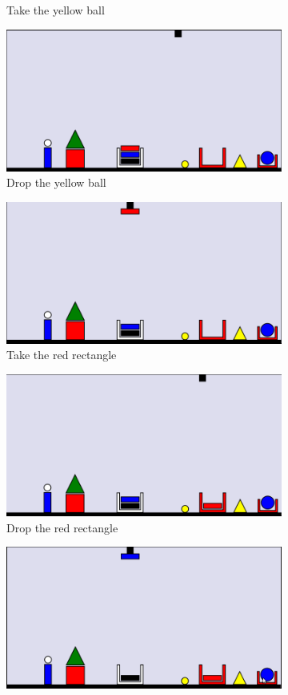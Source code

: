 \begin{figure}
\begin{subfigure}{.5\textwidth}
  \caption{Take the yellow ball}
  \label{fig:4}
\end{subfigure}
\begin{subfigure}{.5\textwidth}
  \centering
  \includegraphics[width=.7\linewidth]{fig/5.png}
  \caption{Drop the yellow ball}
  \label{fig:5}
\end{subfigure}%
\begin{subfigure}{.5\textwidth}
  \centering
  \includegraphics[width=.7\linewidth]{fig/6.png}
  \caption{Take the red rectangle}
  \label{fig:6}
\end{subfigure}
\begin{subfigure}{.5\textwidth}
  \centering
  \includegraphics[width=.7\linewidth]{fig/7.png}
  \caption{Drop the red rectangle}
  \label{fig:7}
\end{subfigure}%
\begin{subfigure}{.5\textwidth}
  \centering
  \includegraphics[width=.7\linewidth]{fig/8.png}

\end{subfigure}
\end{figure}
